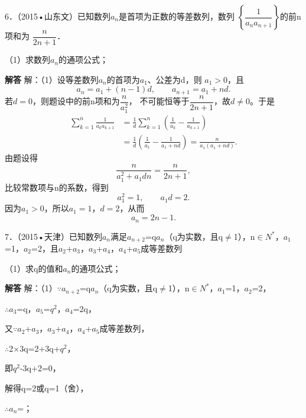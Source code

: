 6．（2015•山东文）已知数列{\ensuremath{a_{n}}}是首项为正数的等差数列，数列
\ensuremath{\left\{\dfrac1{a_na_{n+1}}\right\}}的前n项和为
\ensuremath{\dfrac{n}{2n+1}}．\par
（1）求数列{\ensuremath{a_{n}}}的通项公式；\par
\QuestionSpace{3.5cm}
\ifshowanswers
\par\begingroup\color{solutioncolor}\noindent\textbf{解答}\quad
解：（1）设等差数列{\ensuremath{a_{n}}}的首项为\ensuremath{a_{1}}、公差为d，则
\ensuremath{a_1>0}，且
\[
 a_n=a_1+(n-1)d,\qquad a_{n+1}=a_1+nd.
\]
若\ensuremath{d=0}，则题设中的前n项和为\ensuremath{\dfrac{n}{a_1^2}}，
不可能恒等于\ensuremath{\dfrac{n}{2n+1}}，故\ensuremath{d\ne0}。于是
\[
\begin{aligned}
 \sum_{k=1}^{n}\frac1{a_ka_{k+1}}
 &=\frac1d\sum_{k=1}^{n}\left(\frac1{a_k}-\frac1{a_{k+1}}\right)\\
 &=\frac1d\left(\frac1{a_1}-\frac1{a_1+nd}\right)
 =\frac{n}{a_1(a_1+nd)}.
\end{aligned}
\]
由题设得
\[
 \frac{n}{a_1^2+a_1dn}=\frac{n}{2n+1},
\]
比较常数项与n的系数，得到
\[
 a_1^2=1,\qquad a_1d=2.
\]
因为\ensuremath{a_1>0}，所以\ensuremath{a_1=1}，\ensuremath{d=2}，从而
\[
 \boxed{a_n=2n-1}.
\]
\par\endgroup\fi

7．（2015•天津）已知数列{\ensuremath{a_{n}}}满足\ensuremath{a_{n+2}}=q\ensuremath{a_{n}}（q为实数，且q\ensuremath{\ne}1），n\ensuremath{\in}\ensuremath{N^{*}}，\ensuremath{a_{1}}=1，\ensuremath{a_{2}}=2，且\ensuremath{a_{2}}+\ensuremath{a_{3}}，\ensuremath{a_{3}}+\ensuremath{a_{4}}，\ensuremath{a_{4}}+\ensuremath{a_{5}}成等差数列\par
（1）求q的值和{\ensuremath{a_{n}}}的通项公式；\par
\QuestionSpace{3.5cm}
\ifshowanswers
\par\begingroup\color{solutioncolor}\noindent\textbf{解答}\quad
解：（1）\ensuremath{\because}\ensuremath{a_{n+2}}=q\ensuremath{a_{n}}（q为实数，且q\ensuremath{\ne}1），n\ensuremath{\in}\ensuremath{N^{*}}，\ensuremath{a_{1}}=1，\ensuremath{a_{2}}=2，\par
\ensuremath{\therefore}\ensuremath{a_{3}}=q，\ensuremath{a_{5}}=\ensuremath{q^{2}}，\ensuremath{a_{4}}=2q，\par
又\ensuremath{\because}\ensuremath{a_{2}}+\ensuremath{a_{3}}，\ensuremath{a_{3}}+\ensuremath{a_{4}}，\ensuremath{a_{4}}+\ensuremath{a_{5}}成等差数列，\par
\ensuremath{\therefore}2\ensuremath{\times}3q=2+3q+\ensuremath{q^{2}}，\par
即\ensuremath{q^{2}}-3q+2=0，\par
解得q=2或q=1（舍），\par
\ensuremath{\therefore}\ensuremath{a_{n}}=；\par
\par\endgroup\fi

